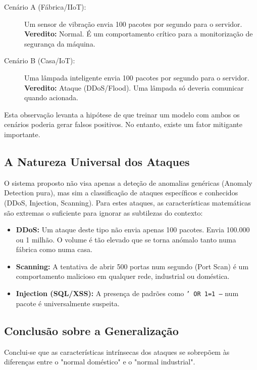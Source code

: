 \documentclass[12pt,a4paper]{article}
\begin{document}
\begin{description}
    \item[\textcolor{ubiBlue}{Cenário A (Fábrica/IIoT):}] Um sensor de vibração envia 100 pacotes por segundo para o servidor. \\
    \textbf{Veredito:} Normal. É um comportamento crítico para a monitorização de segurança da máquina.
    
    \item[\textcolor{ubiBlue}{Cenário B (Casa/IoT):}] Uma lâmpada inteligente envia 100 pacotes por segundo para o servidor. \\
    \textbf{Veredito:} Ataque (DDoS/Flood). Uma lâmpada só deveria comunicar quando acionada.
\end{description}

Esta observação levanta a hipótese de que treinar um modelo com ambos os cenários poderia gerar falsos positivos. No entanto, existe um fator mitigante importante.

\subsection{A Natureza Universal dos Ataques}

O sistema proposto não visa apenas a deteção de anomalias genéricas (Anomaly Detection pura), mas sim a classificação de ataques específicos e conhecidos (DDoS, Injection, Scanning). Para estes ataques, as características matemáticas são extremas o suficiente para ignorar as subtilezas do contexto:

\begin{itemize}
    \item \textbf{DDoS:} Um ataque deste tipo não envia apenas 100 pacotes. Envia 100.000 ou 1 milhão. O volume é tão elevado que se torna anómalo tanto numa fábrica como numa casa.
    \item \textbf{Scanning:} A tentativa de abrir 500 portas num segundo (Port Scan) é um comportamento malicioso em qualquer rede, industrial ou doméstica.
    \item \textbf{Injection (SQL/XSS):} A presença de padrões como \texttt{' OR 1=1 --} num pacote é universalmente suspeita.
\end{itemize}

\subsection{Conclusão sobre a Generalização}
Conclui-se que as características intrínsecas dos ataques se sobrepõem às diferenças entre o "normal doméstico" e o "normal industrial".
\end{document}
